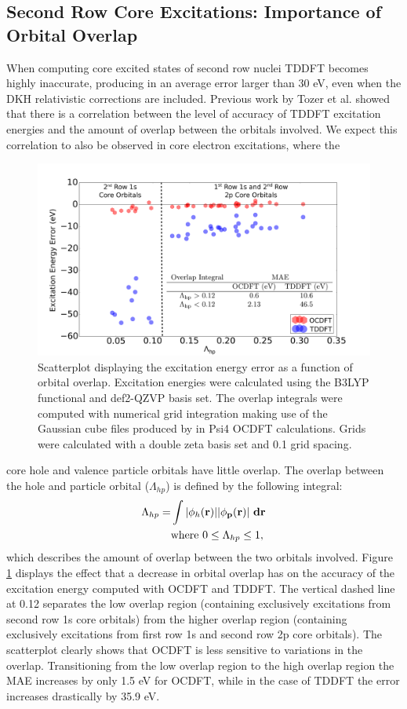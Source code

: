 \documentclass[12pt]{article}
\begin{document}
\subsection{Second Row Core Excitations: Importance of Orbital Overlap}
When computing core excited states of second row nuclei TDDFT becomes highly inaccurate, producing in an average error larger than 30 eV, even when the DKH relativistic corrections are included. Previous work by Tozer et al.\cite{peach_excitation_2008}  showed that there is a correlation between the level of accuracy of TDDFT excitation energies and the amount of overlap between the orbitals involved. We expect this correlation to also be observed in core electron excitations, where the
\begin{figure}[ht]
\includegraphics[scale=0.17]{scatterNEW.pdf}
\caption{Scatterplot displaying the excitation energy error as a function of orbital overlap. Excitation energies were calculated using the B3LYP functional and def2-QZVP basis set. The overlap integrals were computed with numerical grid integration making use of the Gaussian cube files produced by in Psi4 OCDFT calculations. Grids were calculated with a double zeta basis set and 0.1 grid spacing.}
\label{figure:scatter}
\end{figure}
core hole and valence particle orbitals have little overlap. The overlap between the hole and particle orbital ($\Lambda_{hp}$) is defined by the following integral:
\begin{align}
\Lambda_{hp} = &\int |\phi_h (\bf{r})||\phi_p (\bf{r})| \ d\bf{r} \\ &\text{where} \ 0 \leq \Lambda_{hp} \leq 1 , \nonumber
\end{align}
which describes the amount of overlap between the two orbitals involved. Figure \ref{figure:scatter} displays the effect that a decrease in orbital overlap has on the accuracy of the excitation energy computed with OCDFT and TDDFT. The vertical dashed line at 0.12 separates the low overlap region (containing exclusively excitations from second row 1s core orbitals) from the higher overlap region (containing exclusively excitations from first row 1s and second row 2p core orbitals). The scatterplot clearly shows that OCDFT is less sensitive to variations in the overlap. Transitioning from the low overlap region to the high overlap region the MAE increases by only 1.5 eV for OCDFT, while in the case of TDDFT the error increases drastically by 35.9 eV.\\ \\
\end{document}
